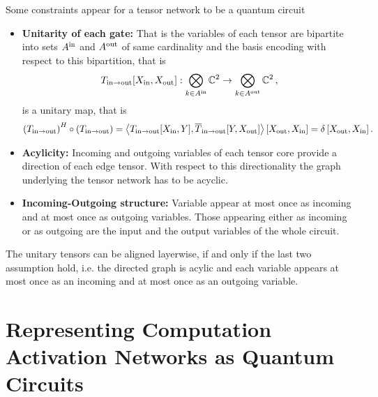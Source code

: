 \documentclass[aps,onecolumn,nofootinbib,pra]{article}
\begin{document}
    Some constraints appear for a tensor network to be a quantum circuit
    \begin{itemize}
        \item \textbf{Unitarity of each gate:} That is the variables of each tensor are bipartite into sets $A^{\mathrm{in}}$ and $A^{\mathrm{out}}$ of same cardinality and the basis encoding with respect to this bipartition, that is
        \begin{align*}
            T_{\mathrm{in} \rightarrow \mathrm{out}}[X_{\mathrm{in}},X_{\mathrm{out}}] : \bigotimes_{k\in A^{\mathrm{in}}} \mathbb{C}^2 \rightarrow \bigotimes_{k\in A^{\mathrm{out}}} \mathbb{C}^2  \, ,
        \end{align*}
        is a unitary map, that is
        \begin{align*}
            \left(T_{\mathrm{in} \rightarrow \mathrm{out}}\right)^H \circ \left(T_{\mathrm{in} \rightarrow \mathrm{out}}\right)
            = \left\langle 
                T_{\mathrm{in} \rightarrow \mathrm{out}}[X_{\mathrm{in}},Y],
                \overline{T}_{\mathrm{in} \rightarrow \mathrm{out}}[Y,X_{\mathrm{out}}]
            \right\rangle \left[ X_{\mathrm{out}},X_{\mathrm{in}} \right]
            = \delta\left[X_{\mathrm{out}},X_{\mathrm{in}}\right].
        \end{align*}
        \item \textbf{Acylicity:} Incoming and outgoing variables of each tensor core provide a direction of each edge tensor. With respect to this directionality the graph underlying the tensor network has to be acyclic.
        \item \textbf{Incoming-Outgoing structure:} Variable appear at most once as incoming and at most once as outgoing variables.
        Those appearing either as incoming or as outgoing are the input and the output variables of the whole circuit.
    \end{itemize}

    The unitary tensors can be aligned layerwise, if and only if the last two assumption hold, i.e. the directed graph is acylic and each variable appears at most once as an incoming and at most once as an outgoing variable.


    \section{Representing Computation Activation Networks as Quantum Circuits}
\end{document}
